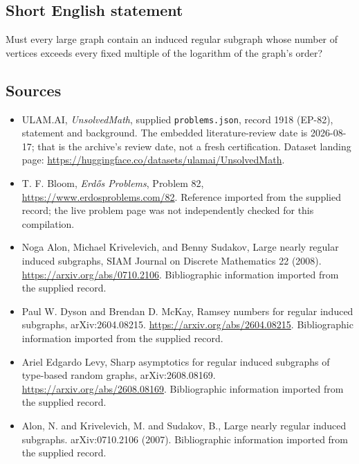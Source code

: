 \documentclass[11pt,a4paper]{article}
\begin{document}
\subsection{Short English statement}

Must every large graph contain an induced regular subgraph whose number of vertices exceeds every fixed multiple of the logarithm of the graph's order?

\subsection{Sources}

{\small

\begin{itemize}

\item[\hypertarget{source:1918:1}{S1}] ULAM.AI, \emph{UnsolvedMath}, supplied \texttt{problems.json}, record 1918 (EP-82), statement and background. The embedded literature-review date is 2026-08-17; that is the archive’s review date, not a fresh certification. Dataset landing page: \url{https://huggingface.co/datasets/ulamai/UnsolvedMath}.

\item[\hypertarget{source:1918:2}{S2}] T. F. Bloom, \emph{Erdős Problems}, Problem 82, \url{https://www.erdosproblems.com/82}. Reference imported from the supplied record; the live problem page was not independently checked for this compilation.

\item[\hypertarget{source:1918:3}{S3}] Noga Alon, Michael Krivelevich, and Benny Sudakov, Large nearly regular induced subgraphs, SIAM Journal on Discrete Mathematics 22 (2008). \url{https://arxiv.org/abs/0710.2106}. Bibliographic information imported from the supplied record.

\item[\hypertarget{source:1918:4}{S4}] Paul W. Dyson and Brendan D. McKay, Ramsey numbers for regular induced subgraphs, arXiv:2604.08215. \url{https://arxiv.org/abs/2604.08215}. Bibliographic information imported from the supplied record.

\item[\hypertarget{source:1918:5}{S5}] Ariel Edgardo Levy, Sharp asymptotics for regular induced subgraphs of type-based random graphs, arXiv:2608.08169. \url{https://arxiv.org/abs/2608.08169}. Bibliographic information imported from the supplied record.

\item[\hypertarget{source:1918:6}{S6}] Alon, N. and Krivelevich, M. and Sudakov, B., Large nearly regular induced subgraphs. arXiv:0710.2106 (2007). Bibliographic information imported from the supplied record.

\end{itemize}

}

\label{end:1918}
\end{document}
